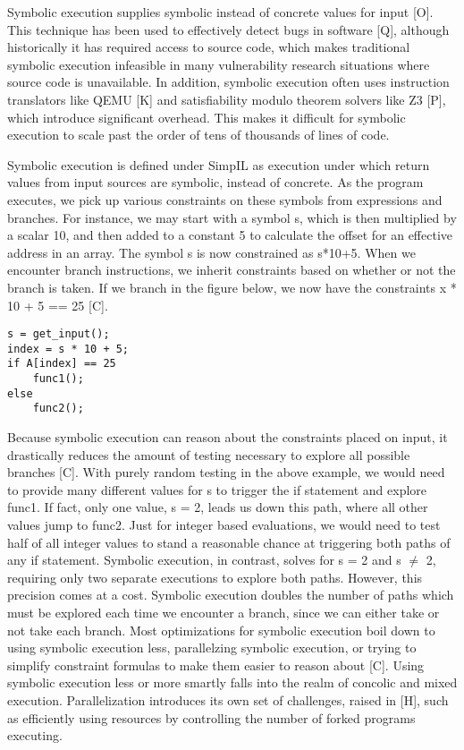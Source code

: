 \documentclass[11pt,expanded,copyright]{fsuthesis}
\begin{document}
Symbolic execution supplies symbolic instead of concrete values for input [O]. This technique has been used to effectively detect bugs in software [Q], although historically it has required access to source code, which makes traditional symbolic execution infeasible in many vulnerability research situations where source code is unavailable. In addition, symbolic execution often uses instruction translators like QEMU [K] and satisfiability modulo theorem solvers like Z3 [P], which introduce significant overhead. This makes it difficult for symbolic execution to scale past the order of tens of thousands of lines of code. 

Symbolic execution is defined under SimpIL as execution under which return values from input sources are symbolic, instead of concrete. As the program executes, we pick up various constraints on these symbols from expressions and branches. For instance, we may start with a symbol s, which is then multiplied by a scalar 10, and then added to a constant 5 to calculate the offset for an effective address in an array. The symbol s is now constrained as s*10+5. When we encounter branch instructions, we inherit constraints based on whether or not the branch is taken. If we branch in the figure below, we now have the constraints x * 10 + 5 == 25 [C].

\begin{lstlisting}[style=cstyle]
s = get_input();
index = s * 10 + 5;
if A[index] == 25
	func1();
else
	func2();
\end{lstlisting}

Because symbolic execution can reason about the constraints placed on input, it drastically reduces the amount of testing necessary to explore all possible branches [C]. With purely random testing in the above example, we would need to provide many different values for s to trigger the if statement and explore func1. If fact, only one value, s = 2, leads us down this path, where all other values jump to func2. Just for integer based evaluations, we would need to test half of all integer values to stand a reasonable chance at triggering both paths of any if statement. Symbolic execution, in contrast, solves for s = 2 and s $\neq$ 2, requiring only two separate executions to explore both paths. However, this precision comes at a cost. Symbolic execution doubles the number of paths which must be explored each time we encounter a  branch, since we can either take or not take each branch. Most optimizations for symbolic execution boil down to using symbolic execution less, parallelzing symbolic execution, or trying to simplify constraint formulas to make them easier to reason about [C]. Using symbolic execution less or more smartly falls into the realm of concolic and mixed execution. Parallelization introduces its own set of challenges, raised in [H], such as efficiently using resources by controlling the number of forked programs executing.
\end{document}
